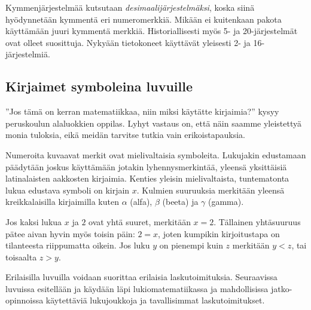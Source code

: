 Kymmenjärjestelmää kutsutaan \emph{desimaalijärjestelmäksi}, koska siinä hyödynnetään kymmentä eri numeromerkkiä.
Mikään ei kuitenkaan pakota käyttämään juuri kymmentä merkkiä. Historiallisesti myös 5- ja 20-järjestelmät ovat olleet suosittuja.
Nykyään tietokoneet käyttävät yleisesti 2- ja 16-järjestelmiä.


\subsection*{Kirjaimet symboleina luvuille}

''Jos tämä on kerran matematiikkaa, niin miksi käytätte kirjaimia?'' kysyy peruskoulun alaluokkien oppilas. Lyhyt vastaus on, että näin saamme yleistettyä monia tuloksia, eikä meidän tarvitse tutkia vain erikoistapauksia.

Numeroita kuvaavat merkit ovat mielivaltaisia symboleita. Lukujakin edustamaan päädytään joskus käyttämään jotakin lyhennysmerkintää, yleensä yksittäisiä latinalaisten aakkosten kirjaimia. Kenties yleisin mielivaltaista, tuntematonta lukua edustava symboli on kirjain $x$. Kulmien suuruuksia merkitään yleensä kreikkalaisilla kirjaimilla kuten $\alpha$ (alfa), $\beta$ (beeta) ja $\gamma$ (gamma).

Jos kaksi lukua $x$ ja $2$ ovat yhtä suuret, merkitään
$x=2$. Tällainen yhtäsuuruus pätee aivan hyvin myös toisin päin: $2=x$, joten kumpikin kirjoitustapa on tilanteesta riippumatta oikein. Jos luku $y$ on pienempi kuin $z$ merkitään $y<z$, tai toisaalta $z>y$.


Erilaisilla luvuilla voidaan suorittaa erilaisia laskutoimituksia. Seuraavissa luvuissa esitellään ja käydään läpi lukiomatematiikassa ja mahdollisissa jatko-opinnoissa käytettäviä lukujoukkoja ja tavallisimmat laskutoimitukset.
